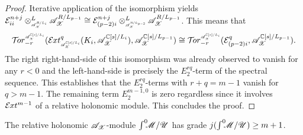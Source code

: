 \begin{proof}
  Iterative application of the isomorphism yields $\E_{ii}^{n+j}\otimes^L_{\scaleto{\A_\X^{R/L_{i}}}{8pt}} \A_\X^{R/L_{p-1}} \cong \E_{(p-2)i}^{n+j}\otimes^L_{\scaleto{\A_\X^{R/L_{p-2}}}{8pt}} \A_\X^{R/L_{p-1}}$.
  This means that
  $$\Tr{\A_\X^{\C[s]/L_{i}}}{-r} (\Ex{\A_\X^{\C[s]/L_{i}} }{q} (K_i,\A_\X^{\C[s]/L_{i}}), \A_\X^{\C[s]/L_{p-1}})\cong \Tr{\A_\X^{\C[s]/L_{i}} }{-r}(\E_{(p-2)i}^{q}, \A_\X^{\C[s]/L_{p-1}}).$$
  The right right-hand-side of this isomorphism was already observed to vanish for any $r < 0$ and the left-hand-side is precisely the $E^{rq}_2$-term of the spectral sequence.
  This establishes that the $E^{rq}_2$-terms with $r+q = m -1$ vanish for $q>m-1$.
  The remaining term $E^{m -1,0}_2$ is zero regardless since it involves $\mathcal{E}\mkern -1mu xt^{m - 1}$ of a relative holonomic module.
  This concludes the proof.
\end{proof}
\begin{lemma}\label{lem: GradeNPlusOne}
  The relative holonomic $\mathscr{A}_{\mathscr{X}}$-module $\int^0 \mkern -8mu\mathscr{M}/\mathscr{U}$ has grade $j(\int^0 \mkern -8mu\mathscr{M}/\mathscr{U})\geq m+1$.
\end{lemma}
